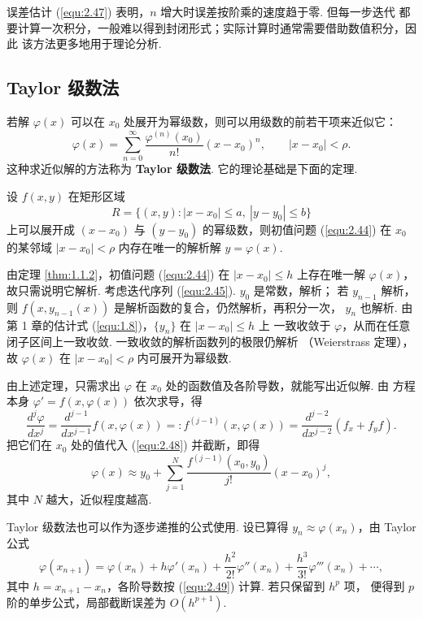 \begin{rmk}
误差估计 (\ref{equ:2.47}) 表明，$n$ 增大时误差按阶乘的速度趋于零. 但每一步迭代
都要计算一次积分，一般难以得到封闭形式；实际计算时通常需要借助数值积分，因此
该方法更多地用于理论分析.
\end{rmk}

\subsection{Taylor 级数法}
若解 $\varphi(x)$ 可以在 $x_0$ 处展开为幂级数，则可以用级数的前若干项来近似它：
\begin{equation}\label{equ:2.48}
\varphi(x)=\sum_{n=0}^{\infty}\frac{\varphi^{(n)}(x_0)}{n!}(x-x_0)^n,
\qquad |x-x_0|<\rho .
\end{equation}
这种求近似解的方法称为 \textbf{Taylor 级数法}. 它的理论基础是下面的定理.

\begin{thm}
设 $f(x,y)$ 在矩形区域
\[
R=\{(x,y):|x-x_0|\le a,\ |y-y_0|\le b\}
\]
上可以展开成 $(x-x_0)$ 与 $(y-y_0)$ 的幂级数，则初值问题 (\ref{equ:2.44}) 在
$x_0$ 的某邻域 $|x-x_0|<\rho$ 内存在唯一的解析解 $y=\varphi(x)$.
\end{thm}
\begin{pf1}
由定理 \ref{thm:1.1.2}，初值问题 (\ref{equ:2.44}) 在 $|x-x_0|\le h$ 上存在唯一解
$\varphi(x)$，故只需说明它解析. 考虑迭代序列 (\ref{equ:2.45}). $y_0$ 是常数，解析；
若 $y_{n-1}$ 解析，则 $f(x,y_{n-1}(x))$ 是解析函数的复合，仍然解析，再积分一次，
$y_n$ 也解析. 由第 1 章的估计式 (\ref{equ:1.8})，$\{y_n\}$ 在 $|x-x_0|\le h$ 上
一致收敛于 $\varphi$，从而在任意闭子区间上一致收敛. 一致收敛的解析函数列的极限仍解析
（Weierstrass 定理），故 $\varphi(x)$ 在 $|x-x_0|<\rho$ 内可展开为幂级数.
\end{pf1}

由上述定理，只需求出 $\varphi$ 在 $x_0$ 处的函数值及各阶导数，就能写出近似解. 由
方程本身 $\varphi'=f(x,\varphi(x))$ 依次求导，得
\begin{equation}\label{equ:2.49}
\frac{d^{j}\varphi}{dx^{j}}=\frac{d^{j-1}}{dx^{j-1}}f(x,\varphi(x))
=:f^{(j-1)}(x,\varphi(x))=\frac{d^{j-2}}{dx^{j-2}}(f_x+f_yf).
\end{equation}
把它们在 $x_0$ 处的值代入 (\ref{equ:2.48}) 并截断，即得
\begin{equation}\label{equ:2.50}
\varphi(x)\approx y_0+\sum_{j=1}^{N}\frac{f^{(j-1)}(x_0,y_0)}{j!}(x-x_0)^j,
\end{equation}
其中 $N$ 越大，近似程度越高.

\begin{rmk}
Taylor 级数法也可以作为逐步递推的公式使用. 设已算得 $y_n\approx\varphi(x_n)$，由
Taylor 公式
\begin{equation}\label{equ:2.51}
\varphi(x_{n+1})=\varphi(x_n)+h\varphi'(x_n)+\frac{h^2}{2!}\varphi''(x_n)
+\frac{h^3}{3!}\varphi'''(x_n)+\cdots,
\end{equation}
其中 $h=x_{n+1}-x_n$，各阶导数按 (\ref{equ:2.49}) 计算. 若只保留到 $h^p$ 项，
便得到 $p$ 阶的单步公式，局部截断误差为 $O(h^{p+1})$.
\end{rmk}

